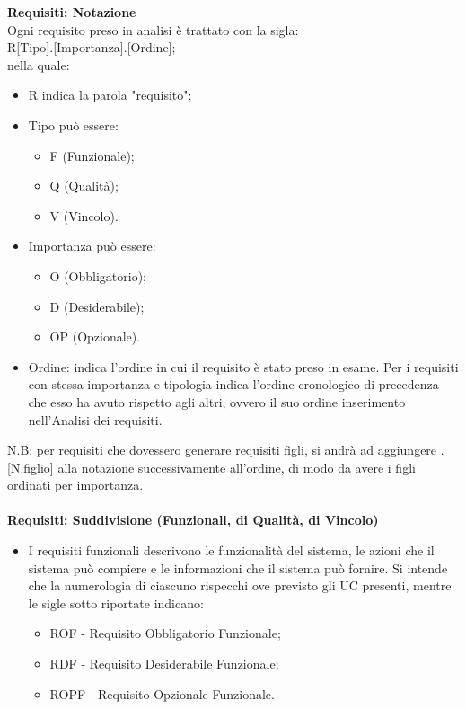 \documentclass[10pt, a4paper]{article}
\begin{document}
\textbf{Requisiti: Notazione}\\
Ogni requisito preso in analisi è trattato con la sigla:\\
R[Tipo].[Importanza].[Ordine];\\
nella quale:\\
\begin{itemize}
\item R indica la parola "requisito";
\item Tipo può essere:
    \begin{itemize}
	\item F (Funzionale);
	\item Q (Qualità);
	\item V (Vincolo).
    \end{itemize}
\item Importanza può essere:
    \begin{itemize}
        \item O (Obbligatorio);
	\item D (Desiderabile);
	\item OP (Opzionale).
    \end{itemize}
\item Ordine: indica l’ordine in cui il requisito è stato preso in esame. Per i requisiti con stessa importanza e tipologia indica l’ordine cronologico di precedenza che esso ha avuto rispetto agli altri, ovvero il suo ordine inserimento nell'Analisi dei requisiti.
\end{itemize}
N.B: per requisiti che dovessero generare requisiti figli, si andrà ad aggiungere .[N.figlio] alla notazione successivamente all’ordine, di modo da avere i figli ordinati per importanza.\\\\
\textbf{Requisiti: Suddivisione (Funzionali, di Qualità, di Vincolo)}
\begin{itemize}
\item I requisiti funzionali descrivono le funzionalità del sistema, le azioni
che il sistema può compiere e le informazioni che il sistema può fornire.
Si intende che la numerologia di ciascuno rispecchi ove previsto gli UC presenti, mentre le sigle sotto
riportate indicano:
\begin{itemize}
    \item ROF - Requisito Obbligatorio Funzionale;
    \item RDF - Requisito Desiderabile Funzionale;
    \item ROPF - Requisito Opzionale Funzionale.
\end{itemize}
\end{itemize}
\end{document}
